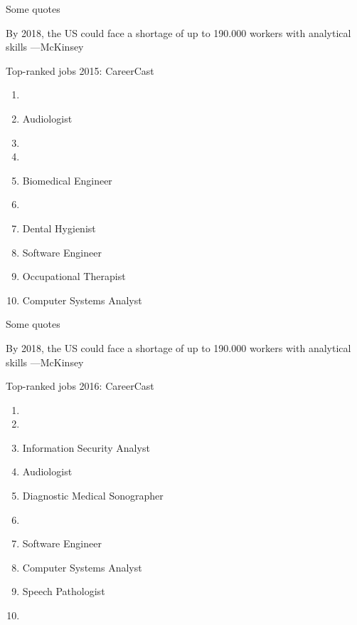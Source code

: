 \documentclass[14pt]{beamer}
\begin{document}
\begin{frame}{Some quotes}
\begin{alertblock}{}
By 2018, the US could face a shortage of up to 190.000 workers with analytical skills ---McKinsey
\end{alertblock}

\begin{block}{Top-ranked jobs 2015: CareerCast}
\fontsize{10}{10}\sf
\begin{enumerate}
\item {} 
\item Audiologist  
\item {}  
\item {}  
\item Biomedical Engineer  
\item {}  
\item Dental Hygienist 
\item Software Engineer 
\item Occupational Therapist 
\item Computer Systems Analyst 
\end{enumerate}
\end{block}



\end{frame}

\begin{frame}{Some quotes}
\begin{alertblock}{}
By 2018, the US could face a shortage of up to 190.000 workers with analytical skills ---McKinsey
\end{alertblock}


\begin{block}{Top-ranked jobs 2016: CareerCast}
\fontsize{10}{10}\sf
\begin{enumerate}
\item {}
\item {}
\item Information Security Analyst
\item Audiologist
\item Diagnostic Medical Sonographer
\item {}
\item Software Engineer
\item Computer Systems Analyst
\item Speech Pathologist
\item {}
\end{enumerate}
\end{block}


\end{frame}
\end{document}
